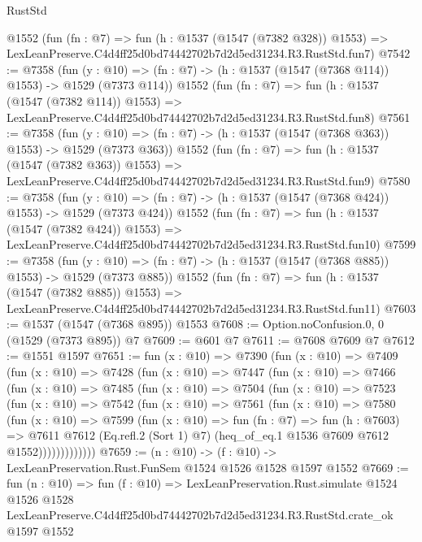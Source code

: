 \begin{lexlean}{RustStd}
\begin{coremodule}
    @1552
    (fun (fn : @7) =>
    fun (h : @1537 (@1547 (@7382 @328)) @1553) =>
    LexLeanPreserve.C4d4ff25d0bd74442702b7d2d5ed31234.R3.RustStd.fun7)
@7542 := @7358
    (fun (y : @10) => (fn : @7) -> (h : @1537 (@1547 (@7368 @114)) @1553) -> @1529 (@7373 @114))
    @1552
    (fun (fn : @7) =>
    fun (h : @1537 (@1547 (@7382 @114)) @1553) =>
    LexLeanPreserve.C4d4ff25d0bd74442702b7d2d5ed31234.R3.RustStd.fun8)
@7561 := @7358
    (fun (y : @10) => (fn : @7) -> (h : @1537 (@1547 (@7368 @363)) @1553) -> @1529 (@7373 @363))
    @1552
    (fun (fn : @7) =>
    fun (h : @1537 (@1547 (@7382 @363)) @1553) =>
    LexLeanPreserve.C4d4ff25d0bd74442702b7d2d5ed31234.R3.RustStd.fun9)
@7580 := @7358
    (fun (y : @10) => (fn : @7) -> (h : @1537 (@1547 (@7368 @424)) @1553) -> @1529 (@7373 @424))
    @1552
    (fun (fn : @7) =>
    fun (h : @1537 (@1547 (@7382 @424)) @1553) =>
    LexLeanPreserve.C4d4ff25d0bd74442702b7d2d5ed31234.R3.RustStd.fun10)
@7599 := @7358
    (fun (y : @10) => (fn : @7) -> (h : @1537 (@1547 (@7368 @885)) @1553) -> @1529 (@7373 @885))
    @1552
    (fun (fn : @7) =>
    fun (h : @1537 (@1547 (@7382 @885)) @1553) =>
    LexLeanPreserve.C4d4ff25d0bd74442702b7d2d5ed31234.R3.RustStd.fun11)
@7603 := @1537 (@1547 (@7368 @895)) @1553
@7608 := Option.noConfusion.{0, 0} (@1529 (@7373 @895)) @7
@7609 := @601 @7
@7611 := @7608 @7609 @7
@7612 := @1551 @1597
@7651 := fun (x : @10) =>
  @7390
    (fun (x : @10) =>
    @7409
      (fun (x : @10) =>
      @7428
        (fun (x : @10) =>
        @7447
          (fun (x : @10) =>
          @7466
            (fun (x : @10) =>
            @7485
              (fun (x : @10) =>
              @7504
                (fun (x : @10) =>
                @7523
                  (fun (x : @10) =>
                  @7542
                    (fun (x : @10) =>
                    @7561
                      (fun (x : @10) =>
                      @7580
                        (fun (x : @10) =>
                        @7599
                          (fun (x : @10) =>
                          fun (fn : @7) =>
                          fun (h : @7603) =>
                          @7611
                            @7612
                            (Eq.refl.{2} (Sort 1) @7)
                            (heq_of_eq.{1} @1536 @7609 @7612 @1552)))))))))))))
@7659 := (n : @10) -> (f : @10) -> LexLeanPreservation.Rust.FunSem @1524 @1526 @1528 @1597 @1552
@7669 := fun (n : @10) =>
  fun (f : @10) =>
  LexLeanPreservation.Rust.simulate
    @1524
    @1526
    @1528
    LexLeanPreserve.C4d4ff25d0bd74442702b7d2d5ed31234.R3.RustStd.crate_ok
    @1597
    @1552
\end{coremodule}
\end{lexlean}

